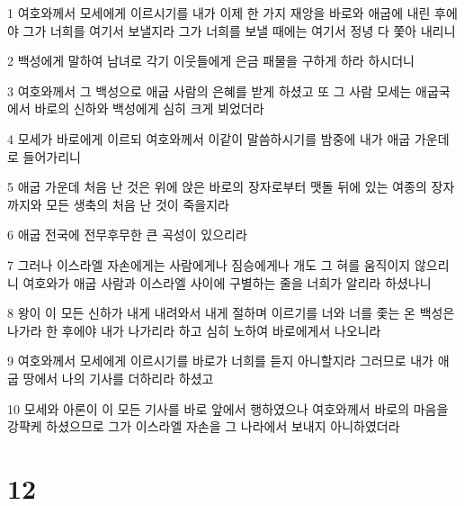 \par 1 여호와께서 모세에게 이르시기를 내가 이제 한 가지 재앙을 바로와 애굽에 내린 후에야 그가 너희를 여기서 보낼지라 그가 너희를 보낼 때에는 여기서 정녕 다 쫓아 내리니
\par 2 백성에게 말하여 남녀로 각기 이웃들에게 은금 패물을 구하게 하라 하시더니
\par 3 여호와께서 그 백성으로 애굽 사람의 은혜를 받게 하셨고 또 그 사람 모세는 애굽국에서 바로의 신하와 백성에게 심히 크게 뵈었더라
\par 4 모세가 바로에게 이르되 여호와께서 이같이 말씀하시기를 밤중에 내가 애굽 가운데로 들어가리니
\par 5 애굽 가운데 처음 난 것은 위에 앉은 바로의 장자로부터 맷돌 뒤에 있는 여종의 장자까지와 모든 생축의 처음 난 것이 죽을지라
\par 6 애굽 전국에 전무후무한 큰 곡성이 있으리라
\par 7 그러나 이스라엘 자손에게는 사람에게나 짐승에게나 개도 그 혀를 움직이지 않으리니 여호와가 애굽 사람과 이스라엘 사이에 구별하는 줄을 너희가 알리라 하셨나니
\par 8 왕이 이 모든 신하가 내게 내려와서 내게 절하며 이르기를 너와 너를 좇는 온 백성은 나가라 한 후에야 내가 나가리라 하고 심히 노하여 바로에게서 나오니라
\par 9 여호와께서 모세에게 이르시기를 바로가 너희를 듣지 아니할지라 그러므로 내가 애굽 땅에서 나의 기사를 더하리라 하셨고
\par 10 모세와 아론이 이 모든 기사를 바로 앞에서 행하였으나 여호와께서 바로의 마음을 강퍅케 하셨으므로 그가 이스라엘 자손을 그 나라에서 보내지 아니하였더라

\chapter{12}

